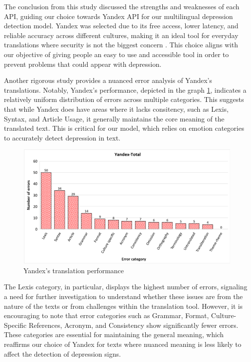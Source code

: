 The conclusion from this study discussed the strengths and weaknesses of each API, guiding our choice towards Yandex API for our multilingual depression detection model. Yandex was selected due to its free access, lower latency, and reliable accuracy across different cultures, making it an ideal tool for everyday translations where security is not the biggest concern \cite{rashmi2020comparison}. This choice aligns with our objective of giving people an easy to use and accessible tool in order to prevent problems that could appear with depression.

Another rigorous study \cite{cambedda2021study} provides a nuanced error analysis of Yandex's translations. Notably, Yandex's performance, depicted in the graph \ref{YandexTranslationPerformance}, indicates a relatively uniform distribution of errors across multiple categories. This suggests that while Yandex does have areas where it lacks consitency, such as Lexis, Syntax, and Article Usage, it generally maintains the core meaning of the translated text. This is critical for our model, which relies on emotion categories to accurately detect depression in text.

\begin{figure}[htbp]
	\centering
		\includegraphics[scale=0.65]{LaTeX Bachelor Thesis Depression Signs Detection/figures/Yandex's-translation-performace.png}
	\caption{Yandex's translation performance \cite{cambedda2021study}}
	\label{YandexTranslationPerformance}
\end{figure}

The Lexis category, in particular, displays the highest number of errors, signaling a need for further investigation to understand whether these issues are from the nature of the texts or from challenges within the translation tool. However, it is encouraging to note that error categories such as Grammar, Format, Culture-Specific References, Acronym, and Consistency show significantly fewer errors. These categories are essential for maintaining the general meaning, which reaffirms our choice of Yandex for texts where nuanced meaning is less likely to affect the detection of depression signs.

